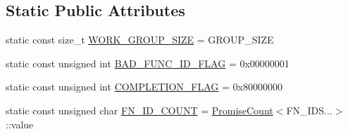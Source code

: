 \subsection*{Static Public Attributes}
\begin{DoxyCompactItemize}
\item 
static const size\-\_\-t \hyperlink{structEventProgram_3_01PromiseUnion_3_01FN__IDS_8_8_8_4_00	PROGRAM__STATE_00	ADR__TYPE_00	GROUP__SIZE_01_4_a40082960571c69b7735d7d3ab1b874b8}{W\-O\-R\-K\-\_\-\-G\-R\-O\-U\-P\-\_\-\-S\-I\-Z\-E} = G\-R\-O\-U\-P\-\_\-\-S\-I\-Z\-E
\item 
static const unsigned int \hyperlink{structEventProgram_3_01PromiseUnion_3_01FN__IDS_8_8_8_4_00	PROGRAM__STATE_00	ADR__TYPE_00	GROUP__SIZE_01_4_a44f5deec1c139eb85004a8aa5e7823a2}{B\-A\-D\-\_\-\-F\-U\-N\-C\-\_\-\-I\-D\-\_\-\-F\-L\-A\-G} = 0x00000001
\item 
static const unsigned int \hyperlink{structEventProgram_3_01PromiseUnion_3_01FN__IDS_8_8_8_4_00	PROGRAM__STATE_00	ADR__TYPE_00	GROUP__SIZE_01_4_a6114ebf54f5c45109eed60d9f682360c}{C\-O\-M\-P\-L\-E\-T\-I\-O\-N\-\_\-\-F\-L\-A\-G} = 0x80000000
\item 
static const unsigned char \hyperlink{structEventProgram_3_01PromiseUnion_3_01FN__IDS_8_8_8_4_00	PROGRAM__STATE_00	ADR__TYPE_00	GROUP__SIZE_01_4_a46ff28ca2bfa9b12fd2fbadb6c6e673b}{F\-N\-\_\-\-I\-D\-\_\-\-C\-O\-U\-N\-T} = \hyperlink{structPromiseCount}{Promise\-Count}$<$F\-N\-\_\-\-I\-D\-S...$>$\-::value
\end{DoxyCompactItemize}


